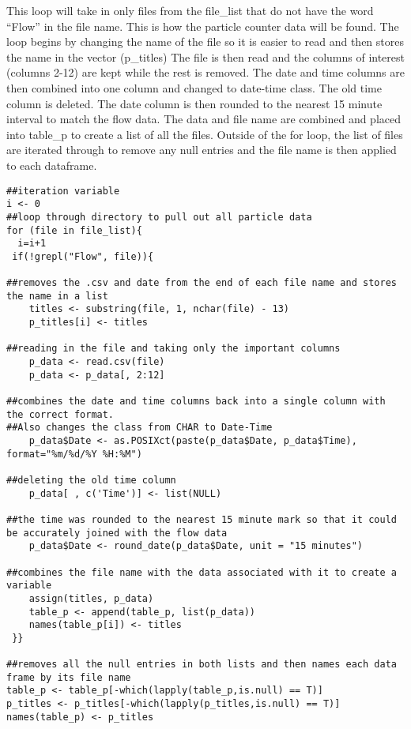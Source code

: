 \documentclass[
]{article}
\begin{document}
This loop will take in only files from the file\_list that do not have
the word ``Flow'' in the file name. This is how the particle counter
data will be found. The loop begins by changing the name of the file so
it is easier to read and then stores the name in the vector (p\_titles)
The file is then read and the columns of interest (columns 2-12) are
kept while the rest is removed. The date and time columns are then
combined into one column and changed to date-time class. The old time
column is deleted. The date column is then rounded to the nearest 15
minute interval to match the flow data. The data and file name are
combined and placed into table\_p to create a list of all the files.
Outside of the for loop, the list of files are iterated through to
remove any null entries and the file name is then applied to each
dataframe.

\begin{verbatim}
##iteration variable
i <- 0
##loop through directory to pull out all particle data
for (file in file_list){
  i=i+1
 if(!grepl("Flow", file)){
   
##removes the .csv and date from the end of each file name and stores the name in a list
    titles <- substring(file, 1, nchar(file) - 13)
    p_titles[i] <- titles
    
##reading in the file and taking only the important columns
    p_data <- read.csv(file)
    p_data <- p_data[, 2:12]
    
##combines the date and time columns back into a single column with the correct format. 
##Also changes the class from CHAR to Date-Time
    p_data$Date <- as.POSIXct(paste(p_data$Date, p_data$Time), format="%m/%d/%Y %H:%M")
    
##deleting the old time column
    p_data[ , c('Time')] <- list(NULL)
    
##the time was rounded to the nearest 15 minute mark so that it could be accurately joined with the flow data
    p_data$Date <- round_date(p_data$Date, unit = "15 minutes")
    
##combines the file name with the data associated with it to create a variable
    assign(titles, p_data)
    table_p <- append(table_p, list(p_data))
    names(table_p[i]) <- titles
 }}

##removes all the null entries in both lists and then names each data frame by its file name
table_p <- table_p[-which(lapply(table_p,is.null) == T)]
p_titles <- p_titles[-which(lapply(p_titles,is.null) == T)]
names(table_p) <- p_titles
\end{verbatim}
\end{document}
